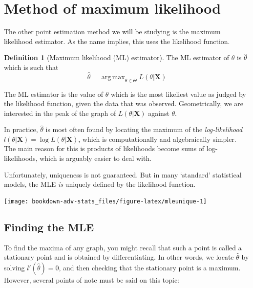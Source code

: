 \documentclass[
]{book}
\newcommand{\bX}{{\boldsymbol X}}
\DeclareMathOperator*{\argmax}{arg\,max}
\theoremstyle{definition}
\newtheorem{definition}{Definition}[chapter]
\theoremstyle{definition}
\theoremstyle{definition}
\theoremstyle{definition}
\theoremstyle{remark}
\begin{document}
\hypertarget{method-of-maximum-likelihood}{%
\section{Method of maximum likelihood}\label{method-of-maximum-likelihood}}

The other point estimation method we will be studying is the maximum likelihood estimator.
As the name implies, this uses the likelihood function.

\begin{definition}[Maximum likelihood (ML) estimator]
The ML estimator of \(\theta\) is \(\hat\theta\) which is such that
\[
\hat\theta = \argmax_{\theta\in\Theta} L(\theta|\bX)
\]
\end{definition}

The ML estimator is the value of \(\theta\) which is the most likeliest value as judged by the likelihood function, given the data that was observed.
Geometrically, we are interested in the peak of the graph of \(L(\theta|\bX)\) against \(\theta\).

In practice, \(\hat\theta\) is most often found by locating the maximum of the \emph{log-likelihood} \(l(\theta|\bX) = \log L(\theta|\bX)\), which is computationally and algebraically simpler.
The main reason for this is products of likelihoods become sums of log-likelihoods, which is arguably easier to deal with.

Unfortunately, uniqueness is not guaranteed. But in many `standard' statistical models, the MLE \emph{is} uniquely defined by the likelihood function.

\begin{center}\texttt{[image: bookdown-adv-stats\_files/figure-latex/mleunique-1]} \end{center}

\hypertarget{finding-the-mle}{%
\subsection{Finding the MLE}\label{finding-the-mle}}

To find the maxima of any graph, you might recall that such a point is called a stationary point and is obtained by differentiating.
In other words, we locate \(\hat\theta\) by solving \(l'(\hat\theta)=0\), and then checking that the stationary point is a maximum.
However, several points of note must be said on this topic:
\end{document}
